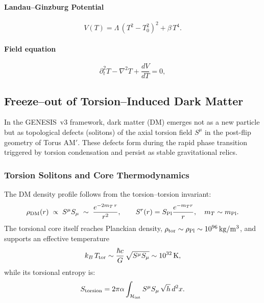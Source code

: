 \documentclass{article}
\newcommand{\Splanck}{S_{\mathrm{Pl}}}
\begin{document}
\paragraph{Landau–Ginzburg Potential}
\[
  V(T) = \Lambda\,(T^2 - T_0^2)^2 + \beta\,T^4.
\]

\paragraph{Field equation}
\[
  \partial_t^2 T - \nabla^2 T + \frac{dV}{dT} = 0,
\]


\subsection{Freeze--out of Torsion--Induced Dark Matter}
\label{subsec:torsion_freezeout}

In the GENESIS~v3 framework, dark matter (DM) emerges not as a new particle but as topological defects (solitons) of the axial torsion field $S^\mu$ in the post-flip geometry of Torus AM$'$. These defects form during the rapid phase transition triggered by torsion condensation and persist as stable gravitational relics.

\subsubsection{Torsion Solitons and Core Thermodynamics}
The DM density profile follows from the torsion–torsion invariant:
\begin{equation}
  \rho_{\rm DM}(r)\;\propto\; S^\mu S_\mu
  \;\sim\;\frac{e^{-2m_T\,r}}{r^2},
  \qquad
  S^r(r) = \Splanck \frac{e^{-m_T r}}{r},\quad
  m_T \sim m_{\rm Pl}.
\end{equation}
The torsional core itself reaches Planckian density,
$\rho_{\rm tor}\sim\rho_{\rm Pl}\sim10^{96}\,\mathrm{kg/m^3}$, and supports an
effective temperature
\begin{equation}
  k_B\,T_{\rm tor}
  \sim \frac{\hbar c}{G}\,\sqrt{S^\mu S_\mu}
  \sim 10^{32}\,\mathrm{K},
\end{equation}
while its torsional entropy is:
\begin{equation}
  S_{\rm torsion}
  = 2\pi\alpha \int_{\mathcal H_{\rm int}} S^\mu S_\mu\, \sqrt{h}\,d^2x.
\end{equation}
\end{document}
